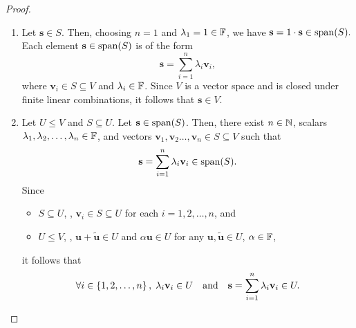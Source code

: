 \documentclass[11pt,openany]{article}
\renewcommand{\vec}[1]{\mathbf{#1}}
\begin{document}
\newpage
{}
\begin{proof}
\ \begin{enumerate}[(1)]
	\item Let \( \vec{s} \in S \). Then, choosing \( n = 1 \) and \(\lambda_1 = 1 \in \mathbb{F}\), we have
		$\vec{s} = 1 \cdot \vec{s} \in \Span(S).$ Each element \( \vec{s} \in \Span(S) \) is of the form
		\[
		\vec{s} = \sum_{i=1}^n \lambda_i \vec{v}_i,
		\]
		where \( \vec{v}_i \in S \subseteq V \) and \( \lambda_i \in \mathbb{F} \). Since \( V \) is a vector space and is closed under finite linear combinations, it follows that $
		\vec{s} \in V.$
	\item Let \( U \le V \) and $S\subseteq U$. Let \( \vec{s} \in \Span(S) \). Then, there exist \( n \in \mathbb{N} \), scalars \( \lambda_1,\lambda_2, \dots, \lambda_n \in \mathbb{F} \), and vectors \( \vec{v}_1, \vec{v}_2 \dots, \vec{v}_n \in S\subseteq V \) such that
	\[
	\vec{s} = \sum_{i=1}^n \lambda_i \vec{v}_i\in\Span(S).
	\] Since \begin{itemize}
		\item $S\subseteq U$, \ie, $\vec{v}_i\in S\subseteq U$ for each $i=1,2,\dots,n$, and
		\item $U\leq V$, \ie, $\vec{u}+\tilde{\vec{u}}\in U$ and $\alpha\vec{u}\in U$ for any $\vec{u},\tilde{\vec{u}}\in U$,\; $\alpha\in\mathbb{F}$,
	\end{itemize} it follows that \[
\forall i\in\set{1,2,\dots,n},\; \lambda_i\vec{v}_i\in U\quad\text{and}\quad\vec{s}=\sum_{i=1}^n \lambda_i \vec{v}_i\in U.
	\]
\end{enumerate}
\end{proof}
\newpage
{}
\end{document}
